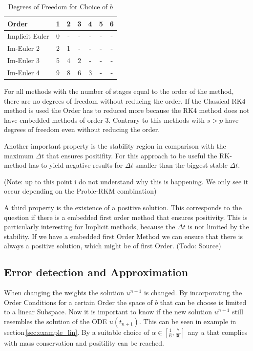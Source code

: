 \documentclass{article}
\begin{document}
 \begin{table}[h!]
\centering   %
 \begin{tabular}{|l |c c c c c c |} 
 \hline 
Order &1&2&3&4&5&6 \\ 
 \hline Implicit Euler&0& - & - & - & - & -  \\ 
 Im-Euler 2&2&1& - & - & - & -  \\ 
 Im-Euler 3&5&4&2& - & - & -  \\ 
 Im-Euler 4&9&8&6&3& - & -  \\ 
 \hline 
 \end{tabular}
 \caption{Degrees of Freedom for Choice of $b$} %
 \label{table:DOF_imp}
 \end{table}


For all methods with the number of stages equal to the order of the method, there are no degrees of freedom without reducing the order. 
If the Classical RK4 method is used the Order has to reduced more because the RK4 method does not have embedded methods of order 3.
Contrary to this methods with $s > p$ have degrees of freedom even without reducing the order. 

Another important property is the stability region in comparison with the maximum $\Delta t$ that ensures positifity. For this approach to be useful the RK-method has to yield negative results for $\Delta t$ smaller than the biggest stable $\Delta t$.

(Note: up to this point i do not understand why this is happening. We only see it occur depending on the Proble-RKM combination)

A third property is the existence of a positive solution. This corresponds to the question if there is a embedded first order method that ensures positivity. This is particularly interesting for Implicit methods, because the $\Delta t$ is not limited by the stability. 
If we have a embedded first Order Method we can ensure that there is always a positive solution, which might be of first Order. (Todo: Source)

\subsection{Error detection and Approximation}
When changing the weights the solution $u^{n+1}$ is changed. 
By incorporating the Order Conditions for a certain Order the space of $b$ that can be choose is limited to a linear Subspace. 
Now it is important to know if the new solution $u^{n+1}$ still resembles the solution of the ODE $u(t_{n+1})$. 
This can be seen in example in section\,\ref{sec:example_lin}.
By a suitable choice of $\alpha \in [\frac{1}{6},\frac{7}{30}]$ any $u$ that complies with mass conservation and positifity can be reached. 
\end{document}
